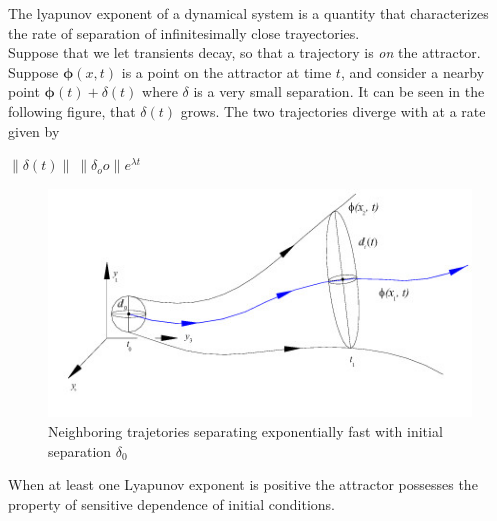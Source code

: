 The lyapunov exponent of a dynamical system is a quantity that characterizes the rate of separation of infinitesimally close trayectories\cite{Parlitz92}.\\

Suppose that we let transients decay, so that a trajectory is \emph{on} the attractor. Suppose $\mathbf{\phi}(x,t)$ is a point on the attractor at time $t$, and consider a nearby point $\mathbf{\phi}(t)+\delta(t)$ where $\delta$ is a very small separation. It can be seen in the following figure, that  $\delta(t)$ grows. The two trajectories diverge with at a rate given by

$\lVert\delta(t) \rVert \ \lVert\delta_oo \rVert e^{\lambda t}$


\begin{figure}[h]
\centering
\includegraphics[scale=0.5]{imagenes/2-benford/Lyap_exp.jpg}
\caption{Neighboring trajetories separating exponentially fast with initial separation $\delta_0$ }
\end{figure}
When at least one Lyapunov exponent is positive the attractor possesses the property of sensitive dependence of initial conditions.
